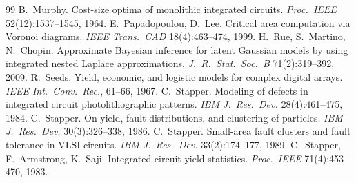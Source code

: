 \documentclass[10pt,twocolumn]{article}
\begin{document}
\begin{thebibliography}{99}
 B.~Murphy. Cost-size optima of monolithic integrated circuits. \emph{Proc.\ IEEE} 52(12):1537--1545, 1964.
 E.~Papadopoulou, D.~Lee. Critical area computation via Voronoi diagrams. \emph{IEEE Trans.\ CAD} 18(4):463--474, 1999.
 H.~Rue, S.~Martino, N.~Chopin. Approximate Bayesian inference for latent Gaussian models by using integrated nested Laplace approximations. \emph{J.\ R.\ Stat.\ Soc.\ B} 71(2):319--392, 2009.
 R.~Seeds. Yield, economic, and logistic models for complex digital arrays. \emph{IEEE Int.\ Conv.\ Rec.}, 61--66, 1967.
 C.~Stapper. Modeling of defects in integrated circuit photolithographic patterns. \emph{IBM J.\ Res.\ Dev.} 28(4):461--475, 1984.
 C.~Stapper. On yield, fault distributions, and clustering of particles. \emph{IBM J.\ Res.\ Dev.} 30(3):326--338, 1986.
 C.~Stapper. Small-area fault clusters and fault tolerance in VLSI circuits. \emph{IBM J.\ Res.\ Dev.} 33(2):174--177, 1989.
 C.~Stapper, F.~Armstrong, K.~Saji. Integrated circuit yield statistics. \emph{Proc.\ IEEE} 71(4):453--470, 1983.
\end{thebibliography}
\end{document}
